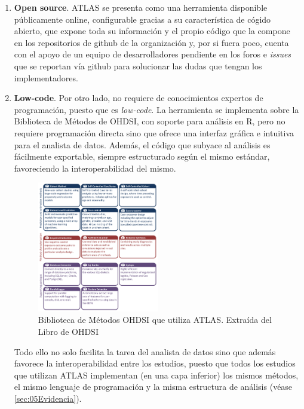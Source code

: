 \begin{enumerate}[label=\roman*.]

    \item \textbf{Open source}. ATLAS se presenta como una herramienta disponible públicamente online, configurable gracias a su característica de cógido abierto, que expone toda su información y el propio código que la compone en los repositorios de github de la organización y, por si fuera poco, cuenta con el apoyo de un equipo de desarrolladores pendiente en los foros e \textit{issues} que se reportan vía github para solucionar las dudas que tengan los implementadores. 

    \item \textbf{Low-code}. Por otro lado, no requiere de conocimientos expertos de programación, puesto que es \textit{low-code}. La herramienta se implementa sobre la Biblioteca de Métodos de OHDSI, con soporte para análisis en R, pero no requiere programación directa sino que ofrece una interfaz gráfica e intuitiva para el analista de datos. Además, el código que subyace al análisis es fácilmente exportable, siempre estructurado según el mismo estándar, favoreciendo la interoperabilidad del mismo.

\begin{figure}[H]
\centering
\includegraphics[width=0.50\textwidth]{figures/methodsLibrary.png}
\caption{Biblioteca de Métodos OHDSI que utiliza ATLAS. Extraída del Libro de OHDSI \cite{OHDSIbook}}
\label{fig:methodsLibrary}
\end{figure}
    
     Todo ello no solo facilita la tarea del analista de datos sino que además favorece la interoperabilidad entre los estudios, puesto que todos los estudios que utilizan ATLAS implementan (en una capa inferior) los mismos métodos, el mismo lenguaje de programación y la misma estructura de análisis (véase \ref{sec:05Evidencia}). 


\end{enumerate}
